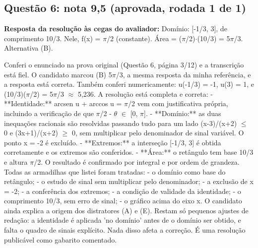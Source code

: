 \documentclass{article}%
\begin{document}
\subsection*{Questão 6: nota 9,5 (aprovada, rodada 1 de 1)}%
\textbf{Resposta da resolução às cegas do avaliador:} Domínio: {[}-1/3, 3{]}, de comprimento 10/3. Nele, f(x) = $\pi$/2 (constante). Área = ($\pi$/2)$\cdot$(10/3) = 5$\pi$/3. Alternativa (B).\par %
Conferi o enunciado na prova original (Questão 6, página 3/12) e a transcrição está fiel. O candidato marcou (B) 5$\pi$/3, a mesma resposta da minha referência, e a resposta está correta. Também conferi numericamente: u(-1/3) = -1, u(3) = 1, e (10/3)($\pi$/2) = 5$\pi$/3 $\approx$ 5,236.\newline%
\newline%
A resolução está completa e correta:\newline%
{-} **Identidade:** arcsen u + arccos u = $\pi$/2 vem com justificativa própria, incluindo a verificação de que $\pi$/2 - $\theta$ $\in$ {[}0, $\pi${]}.\newline%
{-} **Domínio:** as duas inequações racionais são resolvidas passando tudo para um lado (x-3)/(x+2) $\leq$ 0 e (3x+1)/(x+2) $\geq$ 0, sem multiplicar pelo denominador de sinal variável. O ponto x = -2 é excluído.\newline%
{-} **Extremos:** a interseção {[}-1/3, 3{]} é obtida corretamente e os extremos são conferidos.\newline%
{-} **Área:** o retângulo tem base 10/3 e altura $\pi$/2. O resultado é confirmado por integral e por ordem de grandeza.\newline%
\newline%
Todas as armadilhas que listei foram tratadas:\newline%
{-} o domínio como base do retângulo;\newline%
{-} o estudo de sinal sem multiplicar pelo denominador;\newline%
{-} a exclusão de x = -2;\newline%
{-} a conferência dos extremos;\newline%
{-} a condição de validade da identidade;\newline%
{-} o comprimento 10/3, sem erro de sinal;\newline%
{-} o gráfico acima do eixo x.\newline%
\newline%
O candidato ainda explica a origem dos distratores (A) e (E). Restam só pequenos ajustes de redação: a identidade é aplicada 'no domínio' antes de o domínio ser obtido, e falta o quadro de sinais explícito. Nada disso afeta a correção. É uma resolução publicável como gabarito comentado.%
\end{document}
